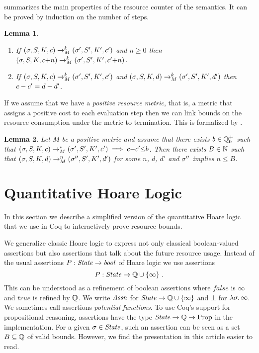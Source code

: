 \documentclass[nocopyrightspace,preprint]{sigplanconf}
\newcommand{\pref}[1]{\prettyref{#1}}
\newtheorem{lemma}{Lemma}
\begin{document}
\pref{lem:sem1} summarizes the main properties of the resource
counter of the semantics.  It can be proved by induction on the number
of steps.
\begin{lemma}
\label{lem:sem1}
  \begin{enumerate}
  \item If $(\sigma, S, K, c) \to_{M}^k (\sigma', S',
    K', c')$ and $n\ge 0$ then $(\sigma, S, K, c {+} n)
    \to_{M}^k (\sigma', S', K', c' {+} n)$.
  \item If $(\sigma, S, K, c) \to_{M}^k (\sigma', S',
    K', c')$ and $(\sigma, S, K, d) \to_{M}^k (\sigma', S',
    K', d')$ then $c - c' = d - d'$.
  \end{enumerate}
\end{lemma}
%
If we assume that we have a \emph{positive resource metric}, that is,
a metric that assigns a positive cost to each evaluation step then we
can link bounds on the resource consumption under the metric to
termination.  This is formalized by \pref{lem:sem_term}.
%
\begin{lemma}
 \label{lem:sem_term}
 Let $M$ be a positive metric and assume that there exists $b \in
 \mathbb Q^+_0$ such that $(\sigma, S, K, c) \to_{M}^*
 (\sigma', S', K', c') \implies c {-} c' {\leq} b$.
 Then there exists $B \in \mathbb{N}$ such that $(\sigma, S, K, d)
 \to_{M}^n (\sigma'', S', K', d')$ for some $n$, $d$, $d'$
 and $\sigma''$ implies $n \le B$.
\end{lemma}


\section{Quantitative Hoare Logic}

In this section we describe a simplified version of the quantitative
Hoare logic that we use in Coq to interactively prove resource bounds.

We generalize classic Hoare logic to express not only classical
boolean-valued assertions but also assertions that talk about the
future resource usage.  Instead of the usual assertions $P : \mathit{State}
\to \mathit{bool}$ of Hoare logic we use assertions
$$
P : \mathit{State} \to \mathbb{Q} \cup \{ \infty \} \; .
$$
This can be understood as a refinement of boolean assertions where
$\mathit{false}$ is $\infty$ and $\mathit{true}$ is refined by $\mathbb{Q}$.
We write $\mathit{Assn}$ for $\mathit{State} \to \mathbb{Q} \cup \{ \infty \}$ and $\bot$ for
$\lambda \sigma . \, \infty$.  We sometimes call assertions
\emph{potential functions}.  To use Coq's support for propositional
reasoning, assertions have the type $\mathit{State} \to \mathbb{Q} \to \mathrm{Prop}$
in the implementation.  For a given $\sigma \in \mathit{State}$, such an
assertion can be seen as a set $B \subseteq \mathbb{Q}$ of valid bounds.
However, we find the presentation in this article easier to read.
\end{document}
